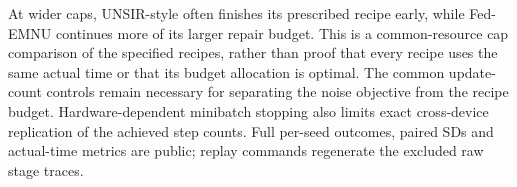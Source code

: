 \documentclass[software,article,submit,moreauthors]{Definitions/mdpi}
\begin{document}
At wider caps, UNSIR-style often finishes its prescribed recipe early, while
Fed-EMNU continues more of its larger repair budget. This is a common-resource
cap comparison of the specified recipes, rather than proof that every recipe
uses the same actual time or that its budget allocation is optimal. The common
update-count controls remain necessary for separating the noise objective from
the recipe budget. Hardware-dependent minibatch stopping also limits exact
cross-device replication of the achieved step counts. Full per-seed outcomes,
paired SDs and actual-time metrics are public; replay commands regenerate
the excluded raw stage traces.



\clearpage
{}

\end{document}
